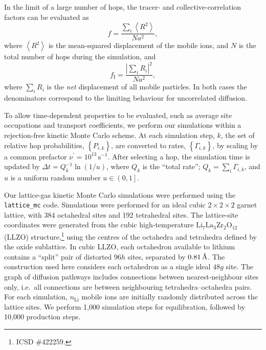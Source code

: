 \documentclass[aps,prb,twocolumn,superscriptaddress,reprint]{revtex4-1}
\newcommand{\set}[1]{\left\{#1\right\}}
\newcommand{\angstrom}{\mbox{\normalfont\AA}}
\renewcommand{\u}[1]{\,\mathrm{#1}}
\newcommand{\m}[1]{\mathrm{#1}}
\newcommand{\chem}[1]{\ensuremath{\mathrm{#1}}}
\begin{document}
In the limit of a large number of hops, the tracer- and collective-correlation factors can be evaluated as
\begin{equation}
  f = \frac{\sum_i\left<R^2\right>}{Na^2},
  \label{eqn:tracer_correlation_factor}
\end{equation}
where $\left<R^2\right>$ is the mean-squared displacement of the mobile ions, and $N$ is the total number of hops during the simulation,\cite{VanDerVenEtAl_PhysRevB2001} and
\begin{equation}
  f_\m{I} = \frac{\left|\sum_i R_i\right|^2}{Na^2},
  \label{eqn:collective_correlation_factor}
\end{equation}
where $\sum_i R_i$ is the \emph{net} displacement of all mobile particles. 
In both cases the denominators correspond to the limiting behaviour for uncorrelated diffusion.

To allow time-dependent properties to be evaluated, such as average site occupations and transport coefficients, we perform our simulations within a rejection-free kinetic Monte Carlo scheme.\cite{Voter_RadiationEffectsInSolids2007} 
At each simulation step, $k$, the set of relative hop probabilities, $\set{P_{i,k}}$, are converted to rates, $\set{\Gamma_{i,k}}$, by scaling by a common prefactor $\nu^\prime=10^{13}\u{s}^{-1}$. 
After selecting a hop, the simulation time is updated by $\Delta t = Q_k^{-1}\ln\left(1/u\right)$, where $Q_k$ is the ``total rate''; $Q_k=\sum_i \Gamma_{i,k}$, and $u$ is a uniform random number $u\in\left(0,1\right]$. 

Our lattice-gas kinetic Monte Carlo simulations were performed using the \texttt{lattice\_mc} code.\cite{Morgan_JOSS2017} 
Simulations were performed for an ideal cubic $2\times2\times2$ garnet lattice, with 384 octahedral sites and 192 tetrahedral sites. 
The lattice-site coordinates were generated from the cubic high-temperature \chem{Li_7La_3Zr_2O_{12}} (LLZO) structure,\footnote{ICSD \#422259.\cite{AwakaEtAl_ChemLett2011}} using the centres of the octahedra and tetrahedra defined by the oxide sublattice. 
In cubic LLZO, each octahedron available to lithium contains a ``split'' pair of distorted $96h$ sites, separated by $0.81\u{\angstrom}$. 
The construction used here considers each octahedron as a single ideal $48g$ site. 
The graph of diffusion pathways includes connections between nearest-neighbour sites only, i.e.\ all connections are between neighbouring tetrahedra--octahedra pairs. For each simulation, $n_\m{Li}$ mobile ions are initially randomly distributed across the lattice sites. We perform 1,000 simulation steps for equilibration, followed by 10,000 production steps. 
\end{document}
